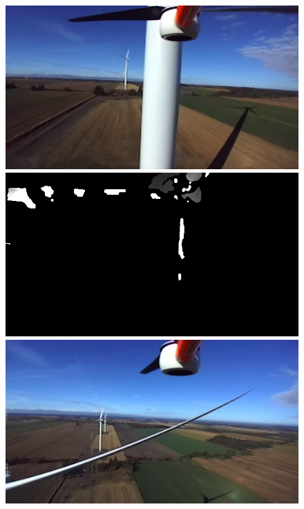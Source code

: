 \begin{figure}[htp]
  \centering
  \begin{minipage}{0.49\textwidth}
    \centering
    \includegraphics[width=\linewidth]{images/field_stereo_fail_rgb.png}
  \end{minipage}
  \begin{minipage}{0.49\textwidth}
    \centering
    \includegraphics[width=\linewidth]{images/field_stereo_fail_pcl.png}
  \end{minipage}
  \begin{minipage}{0.49\textwidth}
    \centering
    \includegraphics[width=\linewidth]{images/field_stereo_fail_rgb2.png}

\end{minipage}
\end{figure}
